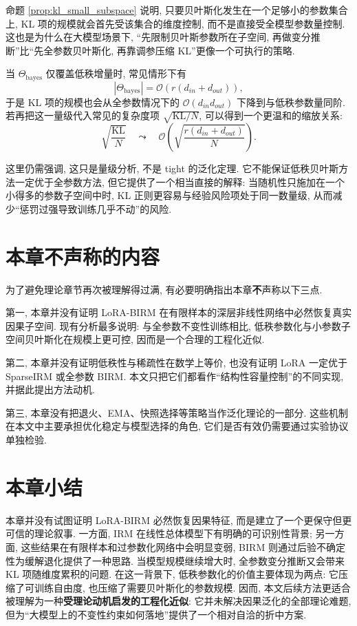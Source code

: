 \documentclass[a4paper,punct=banjiao,twoside]{ctexrep}
\theoremstyle{plain}
\theoremstyle{definition}
\theoremstyle{remark}
\begin{document}
命题 \ref{prop:kl_small_subspace} 说明, 只要贝叶斯化发生在一个足够小的参数集合上, KL 项的规模就会首先受该集合的维度控制, 而不是直接受全模型参数量控制. 这也是为什么在大模型场景下, “先限制贝叶斯参数所在子空间, 再做变分推断”比“先全参数贝叶斯化, 再靠调参压缩 KL”更像一个可执行的策略.

当 $\Theta_{\text{bayes}}$ 仅覆盖低秩增量时, 常见情形下有
\begin{equation}
    |\Theta_{\text{bayes}}| = \mathcal{O}(r(d_{in}+d_{out})),
\end{equation}
于是 KL 项的规模也会从全参数情况下的 $\mathcal{O}(d_{in}d_{out})$ 下降到与低秩参数量同阶. 若再把这一量级代入常见的复杂度项 $\sqrt{\text{KL}/N}$, 可以得到一个更温和的缩放关系:
\begin{equation}
    \sqrt{\frac{\text{KL}}{N}}
    \quad \leadsto \quad
    \mathcal{O}\!\left(\sqrt{\frac{r(d_{in}+d_{out})}{N}}\right).
\end{equation}

这里仍需强调, 这只是量级分析, 不是 tight 的泛化定理. 它不能保证低秩贝叶斯方法一定优于全参数方法, 但它提供了一个相当直接的解释: 当随机性只施加在一个小得多的参数子空间中时, KL 正则更容易与经验风险项处于同一数量级, 从而减少“惩罚过强导致训练几乎不动”的风险.

\section{本章不声称的内容}

为了避免理论章节再次被理解得过满, 有必要明确指出本章\textbf{不}声称以下三点.

第一, 本章并没有证明 LoRA-BIRM 在有限样本的深层非线性网络中必然恢复真实因果子空间. 现有分析最多说明: 与全参数不变性训练相比, 低秩参数化与小参数子空间贝叶斯化在规模上更可控, 因而是一个合理的工程化近似.

第二, 本章并没有证明低秩性与稀疏性在数学上等价, 也没有证明 LoRA 一定优于 SparseIRM 或全参数 BIRM. 本文只把它们都看作“结构性容量控制”的不同实现, 并据此提出方法动机.

第三, 本章没有把退火、EMA、快照选择等策略当作泛化理论的一部分. 这些机制在本文中主要承担优化稳定与模型选择的角色, 它们是否有效仍需要通过实验协议单独检验.

\section{本章小结}

本章并没有试图证明 LoRA-BIRM 必然恢复因果特征, 而是建立了一个更保守但更可信的理论叙事. 一方面, IRM 在线性总体模型下有明确的可识别性背景; 另一方面, 这些结果在有限样本和过参数化网络中会明显变弱, BIRM 则通过后验不确定性为缓解退化提供了一种思路. 当模型规模继续增大时, 全参数变分推断又会带来 KL 项随维度累积的问题. 在这一背景下, 低秩参数化的价值主要体现为两点: 它压缩了可训练自由度, 也压缩了需要贝叶斯化的参数规模. 因而, 本文后续方法更适合被理解为一种\textbf{受理论动机启发的工程化近似}: 它并未解决因果泛化的全部理论难题, 但为“大模型上的不变性约束如何落地”提供了一个相对自洽的折中方案.
\end{document}
